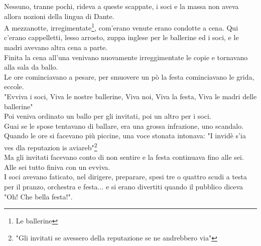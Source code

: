 Nessuno, tranne pochi, rideva a queste scappate, i soci e la massa non aveva allora nozioni della lingua di Dante.\\
A mezzanotte, irregimentate\footnote{Le ballerine}, com'erano venute erano condotte a cena. Qui c'erano cappelletti, lesso arrosto, zuppa inglese per le ballerine ed i soci, e le madri avevano altra cena a parte.\\
Finita la cena all'una venivano nuovamente irreggimentate le copie e tornavano alla sala da ballo.\\
Le ore cominciavano a pesare, per smuovere un pò la festa cominciavano le grida, eccole.\\
"Evviva i soci, Viva le nostre ballerine, Viva noi, Viva la festa, Viva le madri delle ballerine"\\
Poi veniva ordinato un ballo per gli invitati, poi un altro per i soci.\\
Guai se le spose tentavano di ballare, era una grossa infrazione, uno scandalo.\\
Quando le ore si facevano più piccine, una voce stonata intonava: "I invidè s'ia ves dla reputazion is aviareb"\footnote{"Gli invitati se avessero della reputazione se ne andrebbero via"}\\
Ma gli invitati facevano conto di non sentire e la festa continuava fino alle sei. Alle sei tutto finiva con un evviva.\\
I soci avevano faticato, nel dirigere, preparare, spesi tre o quattro scudi a testa per il pranzo, orchestra e festa... e si erano divertiti quando il pubblico diceva "Oh! Che bella festa!".

